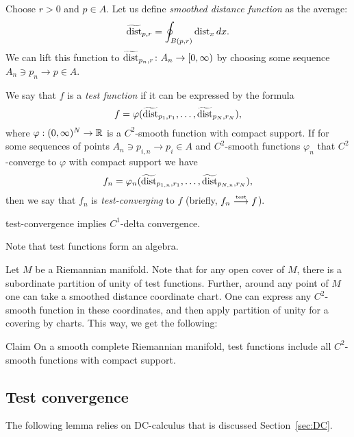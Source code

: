 Choose $r>0$ and $p\in A$.
Let us define \emph{smoothed distance function} as the average:
$$\widetilde{\operatorname{\rm dist}}_{p,r} =\oint_{B(p,r)} \operatorname{\rm dist}_{x}dx.$$ 
We can lift this function to
$\widetilde{\operatorname{\rm dist}}_{p_n,r}\colon A_n\to [0,\infty)$
by choosing some  sequence $A_n\ni p_n\to p\in A$.

We say that $f$ is a \emph{test function} if it can be expressed by the formula
$$f=\varphi( \widetilde{\operatorname{\rm dist}}_{p_1,r_1}, \dots,   \widetilde{\operatorname{\rm dist}}_{p_N,r_N}),$$
where $\varphi:(0,\infty)^N\to\mathbb{R}$ is a $C^2$-smooth function with compact support.
If for some sequences of points $A_n\ni p_{i,n}\to p_i\in A$ and $C^2$-smooth functions $\varphi_n$ that $C^2$-converge to $\varphi$ with compact support we have
$$f_n=\varphi_n( \widetilde{\operatorname{\rm dist}}_{p_{1,n},r_1},\dots,   \widetilde{\operatorname{\rm dist}}_{p_{N,n},r_N}),$$
then we say that $f_n$ is \emph{test-converging} to $f$ (briefly, $f_n\stackrel{\text{\tiny\rm test}}{\longrightarrow} f$).

 {\color{blue} test-convergence implies $C^1$-delta convergence.
}

Note that test functions form an algebra.

Let $M$ be a Riemannian manifold.
Note that for any open cover of $M$, there is a subordinate partition of unity of test functions.
Further, around any point of $M$ one can take a smoothed distance 
coordinate chart.
One can express any $C^2$-smooth function in these 
coordinates, and then apply partition of unity for a covering by charts.
This way, we get the following:

\begin{thm}{Claim}
On a smooth complete Riemannian manifold, test functions
include all $C^2$-smooth functions with compact support.
\end{thm}



\subsection{Test convergence}

The following lemma relies on DC-calculus that is discussed Section~\ref{sec:DC}.

